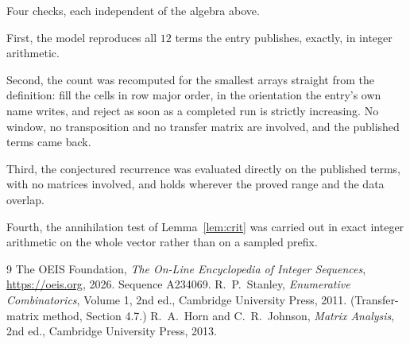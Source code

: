 \documentclass[11pt,a4paper]{article}
\theoremstyle{plain}
\theoremstyle{definition}
\begin{document}
Four checks, each independent of the algebra above.

First, the model reproduces all $12$ terms the entry publishes, exactly, in integer
arithmetic.

Second, the count was recomputed for the smallest arrays straight from the definition: fill the
cells in row major order, in the orientation the entry's own name writes, and reject as soon as
a completed run is strictly increasing. No window, no transposition and no transfer matrix are involved, and
the published terms came back.

Third, the conjectured recurrence was evaluated directly on the published terms, with no
matrices involved, and holds wherever the proved range and the data overlap.

Fourth, the annihilation test of Lemma~\ref{lem:crit} was carried out in exact integer
arithmetic on the whole vector rather than on a sampled prefix.

\begin{thebibliography}{9}
 The OEIS Foundation, \emph{The On-Line Encyclopedia of Integer
Sequences}, \url{https://oeis.org}, 2026. Sequence A234069.
 R.~P.~Stanley, \emph{Enumerative Combinatorics}, Volume 1, 2nd ed.,
Cambridge University Press, 2011. (Transfer-matrix method, Section 4.7.)
 R.~A.~Horn and C.~R.~Johnson, \emph{Matrix Analysis}, 2nd ed., Cambridge
University Press, 2013.
\end{thebibliography}
\end{document}
